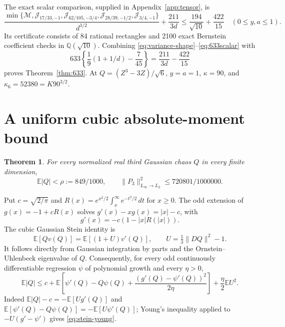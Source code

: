 \documentclass[11pt]{article}
\newcommand{\E}{\mathbb E}
\newtheorem{theorem}{Theorem}
\begin{document}
The exact scalar comparison, supplied in Appendix~\ref{app:tensor}, is
\begin{equation}\label{eq:633scalar}
 \frac{\min\{\mathcal M,\mathcal J_{17/33,-1},
 \mathcal J_{62/105,-3/4},\mathcal J_{28/39,-1/2},
 \mathcal J_{3/4,-1}\}}{d^{3/2}}+\frac{211}{3d}
 \le\frac{194}{\sqrt{10}}+\frac{422}{15}
 \quad(0\le y,a\le1).
\end{equation}
Its certificate consists of 84 rational rectangles and 2100 exact
Bernstein coefficient checks in $\mathbb Q(\sqrt{10})$.
Combining \eqref{eq:variance-shape}--\eqref{eq:633scalar} with
\[
 633\left\{\frac19(1+1/d)-\frac7{45}\right\}
 =\frac{211}{3d}-\frac{422}{15}
\]
proves Theorem~\ref{thm:633}. At $Q=(Z^3-3Z)/\sqrt6$,
$y=a=1$, $\kappa=90$, and $\kappa_6=52380=K90^{3/2}$.

\section{A uniform cubic absolute-moment bound}\label{sec:stein}
\begin{theorem}\label{thm:l1}
For every normalized real third Gaussian chaos $Q$ in every finite
dimension,
\begin{equation}\label{eq:rho}
 \E|Q|<\rho:=849/1000,\qquad
 \|P_3\|_{L_\infty\to L_2}^2\le720801/1000000.
\end{equation}
\end{theorem}

Put $c=\sqrt{2/\pi}$ and
$R(x)=e^{x^2/2}\int_x^\infty e^{-t^2/2}\,dt$ for $x\ge0$.
The odd extension of $g(x)=-1+cR(x)$ solves
$g'(x)-xg(x)=|x|-c$, with
\[
 g'(x)=-c(1-|x|R(|x|)).
\]
The cubic Gaussian Stein identity is
\begin{equation}\label{eq:stein}
 \E[Qv(Q)]=\E[(1+U)v'(Q)],
 \qquad U=\tfrac13\|DQ\|^2-1.
\end{equation}
It follows directly from Gaussian integration by parts and the
Ornstein--Uhlenbeck eigenvalue of $Q$. Consequently, for every odd
continuously differentiable regression $\psi$ of polynomial growth and
every $\eta>0$,
\begin{equation}\label{eq:stein-young}
 \E|Q|\le c+\E\left[\psi'(Q)-Q\psi(Q)
 +\frac{(g'(Q)-\psi'(Q))^2}{2\eta}\right]
 +\frac\eta2\E U^2.
\end{equation}
Indeed $\E|Q|-c=-\E[Ug'(Q)]$ and
$\E[\psi'(Q)-Q\psi(Q)]=-\E[U\psi'(Q)]$; Young's inequality
applied to $-U(g'-\psi')$ gives \eqref{eq:stein-young}.
\end{document}
